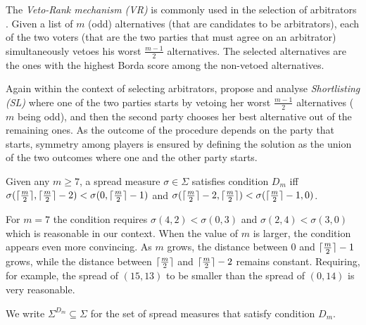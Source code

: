 The \emph{Veto-Rank mechanism (VR)} is commonly used in the selection of arbitrators \citep{Clippel2014}. Given a list of $m$ (odd) alternatives (that are candidates to be arbitrators), each of the two voters (that are the two parties that must agree on an arbitrator) simultaneously vetoes his worst $\frac{m-1}{2}$ alternatives. The selected alternatives are the ones with the highest Borda score among the non-vetoed alternatives.

Again within the context of selecting arbitrators, \citet{Clippel2014} propose and analyse \emph{Shortlisting (SL)} where one of the two parties starts by vetoing her worst $\frac{m-1}{2}$ alternatives ($m$ being odd), and then the second party chooses her best alternative out of the remaining ones. As the outcome of the procedure depends on the party that starts, symmetry among players is ensured by defining the solution as the union of the two outcomes where one and the other party starts.


\begin{definition}
	Given any $m \geq 7$, a spread measure $\sigma \in \Sigma$ satisfies condition $D_m$ iff 
	$\sigma(\lceil\frac{m}{2}\rceil, \lceil\frac{m}{2}\rceil - 2) < \sigma(0, \lceil\frac{m}{2}\rceil - 1)$ and 
	$\sigma(\lceil\frac{m}{2}\rceil - 2, \lceil\frac{m}{2}\rceil) < \sigma(\lceil\frac{m}{2}\rceil - 1, 0)$.
\end{definition}

For $m=7$ the condition requires $\sigma(4, 2) < \sigma(0, 3)$ and $\sigma(2, 4) < \sigma(3, 0)$ which is reasonable in our context. When the value of $m$ is larger, the condition appears even more convincing. As $m$ grows, the distance between $0$ and $\lceil\frac{m}{2}\rceil - 1$ grows, while the distance between $\lceil\frac{m}{2}\rceil$ and $\lceil\frac{m}{2}\rceil - 2$ remains constant. Requiring, for example, the spread of $(15, 13)$ to be smaller than the spread of $(0, 14)$ is very reasonable.

We write $\Sigma^{D_{m}} \subseteq \Sigma$ for the set of spread measures that satisfy condition $D_{m}$. 

